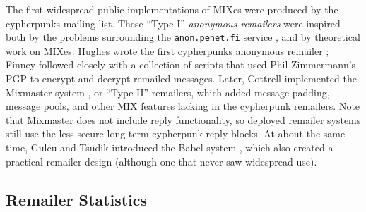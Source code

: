 \documentclass{llncs}
\begin{document}
The first widespread public implementations of MIXes were produced by the
cypherpunks mailing list. These ``Type I'' \emph{anonymous remailers}
were inspired both by the problems surrounding the {\tt anon.penet.fi}
service \cite{helsingius}, and by theoretical work on MIXes. Hughes wrote
the first cypherpunks anonymous remailer \cite{remailer-history}; Finney
followed closely with a collection of scripts that used Phil Zimmermann's
PGP to encrypt and decrypt remailed messages. Later, Cottrell implemented
the Mixmaster system \cite{mixmaster}, or ``Type II'' remailers, which
added message padding, message pools, and other MIX features lacking
in the cypherpunk remailers. Note that Mixmaster does not include reply
functionality, so deployed remailer systems still use the less secure
long-term cypherpunk reply blocks. At about the same time, Gulcu and
Tsudik introduced the Babel system \cite{babel}, which also created a
practical remailer design (although one that never saw widespread
use).  



%
%

\subsection{Remailer Statistics}
\end{document}
